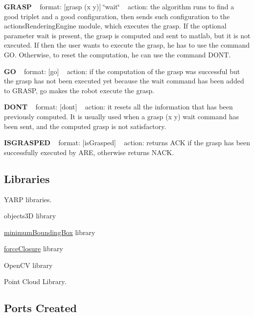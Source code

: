{\bfseries G\+R\+A\+SP} ~\newline
format\+: \mbox{[}grasp (x y)\mbox{]} \char`\"{}wait\char`\"{} ~\newline
action\+: the algorithm runs to find a good triplet and a good configuration, then sends such configuration to the actions\+Rendering\+Engine module, which executes the grasp. If the optional parameter wait is present, the grasp is computed and sent to matlab, but it is not executed. If then the user wants to execute the grasp, he has to use the command GO. Otherwise, to reset the computation, he can use the command D\+O\+NT.

{\bfseries GO} ~\newline
format\+: \mbox{[}go\mbox{]} ~\newline
action\+: if the computation of the grasp was successful but the grasp has not been executed yet because the wait command has been added to G\+R\+A\+SP, go makes the robot execute the grasp.

{\bfseries D\+O\+NT} ~\newline
format\+: \mbox{[}dont\mbox{]} ~\newline
action\+: it resets all the information that has been previously computed. It is usually used when a grasp (x y) wait command has been sent, and the computed grasp is not satisfactory.

{\bfseries I\+S\+G\+R\+A\+S\+P\+ED} ~\newline
format\+: \mbox{[}is\+Grasped\mbox{]} ~\newline
action\+: returns A\+CK if the grasp has been successfully executed by A\+RE, otherwise returns N\+A\+CK.\hypertarget{group__handIKModule_lib_sec}{}\subsection{Libraries}\label{group__handIKModule_lib_sec}

\begin{DoxyItemize}
\item Y\+A\+RP libraries.
\item objects3D library
\item \hyperlink{group__minimumBoundingBox}{minimum\+Bounding\+Box} library
\item \hyperlink{group__forceClosure}{force\+Closure} library
\item Open\+CV library
\item Point Cloud Library.
\end{DoxyItemize}\hypertarget{group__handIKModule_portsc_sec}{}\subsection{Ports Created}\label{group__handIKModule_portsc_sec}

